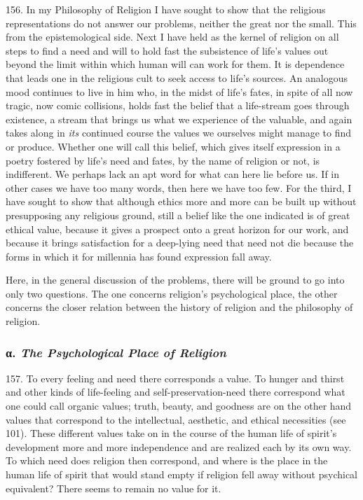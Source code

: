 \documentclass[12pt,a4paper]{book}
\newcommand{\opage}[1]{\marginnote{\footnotesize\textit{[#1]}}}
\begin{document}
156. In my Philosophy of Religion I have sought to show that the religious representations do not
answer our problems, neither \opage{374}the great nor the small. This from the epistemological side. Next I have
held as the kernel of religion on all steps to find a need and will to hold fast the subsistence of
life's values out beyond the limit within which human will can work for them. It is dependence that
leads one in the religious cult to seek access to life's sources. An analogous mood continues to live
in him who, in the midst of life's fates, in spite of all now tragic, now comic collisions, holds fast
the belief that a life-stream goes through existence, a stream that brings us what we experience of the
valuable, and again takes along in \emph{its} continued course the values we ourselves might manage to
find or produce. Whether one will call this belief, which gives itself expression in a poetry fostered
by life's need and fates, by the name of religion or not, is indifferent. We perhaps lack an apt word
for what can here lie before us. If in other cases we have too many words, then here we have too few. For
the third, I have sought to show that although ethics more and more can be built up without
presupposing any religious ground, still a belief like the one indicated is of great ethical value,
because it gives a prospect onto a great horizon for our work, and because it brings satisfaction for a
deep-lying need that need not die because the forms in which it for millennia has found expression fall
away.

Here, in the general discussion of the problems, there will be ground to go into only two questions. The
one concerns religion's psychological place, the other concerns the closer relation between the history
of religion and the philosophy of religion.

\subsubsection*{α. \emph{The Psychological Place of Religion}}

157. To every feeling and need there corresponds a value. To hunger and thirst and other kinds of
life-feeling and self-preservation-need there correspond what one could call organic values; truth,
beauty, and goodness are on the other hand values that correspond to the intellectual, aesthetic, and
ethical necessities \opage{375}(see 101). These different values take on in the course of the human life of
spirit's development more and more independence and are realized each by its own way. To which need
does religion then correspond, and where is the place in the human life of spirit that would stand
empty if religion fell away without psychical equivalent? There seems to remain no value for it.
\end{document}
